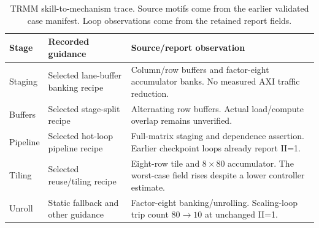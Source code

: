 \begin{table}[t]
\centering
\caption{TRMM skill-to-mechanism trace. Source motifs come from the earlier validated case manifest. Loop observations come from the retained report fields. %
}
\label{tab:trmm-skill-trace}
\small
\setlength{\tabcolsep}{4pt}
\begin{tabularx}{\linewidth}{@{}Y{0.45}Y{0.85}Y{1.7}@{}}
\toprule
Stage & Recorded guidance & Source/report observation \\
\midrule
Staging & Selected lane-buffer banking recipe & Column/row buffers and factor-eight accumulator banks. No measured AXI traffic reduction. \\
Buffers & Selected stage-split recipe & Alternating row buffers. Actual load/compute overlap remains unverified. \\
Pipeline & Selected hot-loop pipeline recipe & Full-matrix staging and dependence assertion. Earlier checkpoint loops already report II=1. \\
Tiling & Selected reuse/tiling recipe & Eight-row tile and $8\times80$ accumulator. The worst-case field rises despite a lower controller estimate. \\
Unroll & Static fallback and other guidance & Factor-eight banking/unrolling. Scaling-loop trip count $80\to10$ at unchanged II=1. \\
\bottomrule
\end{tabularx}
\end{table}
